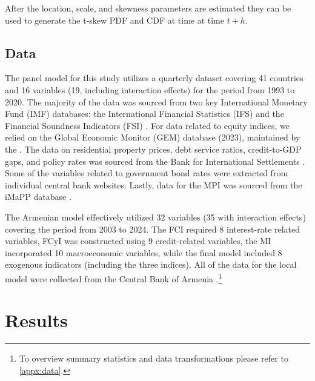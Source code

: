 \documentclass[12pt,a4paper]{article}
\begin{document}
After the location, scale, and skewness parameters are estimated they can be used to generate the t-skew PDF and CDF at time at time $t+h$.

\subsection{Data}
The panel model for this study utilizes a quarterly dataset covering 41 countries and 16 variables (19, including interaction effects) for the period from 1993 to 2020. The majority of the data was sourced from two key International Monetary Fund (IMF) databases: the International Financial Statistics (IFS) and the Financial Soundness Indicators (FSI) \citep{ifs2024, fsi2024}. For data related to equity indices, we relied on the Global Economic Monitor (GEM) database (2023), maintained by the \citet{gem2024}. The data on residential property prices, debt service ratios, credit-to-GDP gaps, and policy rates was sourced from the Bank for International Settlements \citep{RPP, DSR, CREDIT_GAPS, CBPOL}. Some of the variables related to government bond rates were extracted from individual central bank websites. Lastly, data for the MPI was sourced from the iMaPP database \citep{alam2019}.

The Armenian model effectively utilized 32 variables (35 with interaction effects) covering the period from 2003 to 2024. The FCI required 8 interest-rate related variables, FCyI was constructed using 9 credit-related variables, the MI incorporated 10 macroeconomic variables, while the final model included 8 exogenous indicators (including the three indices). All of the data for the local model were collected from the Central Bank of Armenia \citep{cba2024}.\footnote{To overview summary statistics and data transformations please refer to \ref{appx:data}.}


\section{Results}
\end{document}
